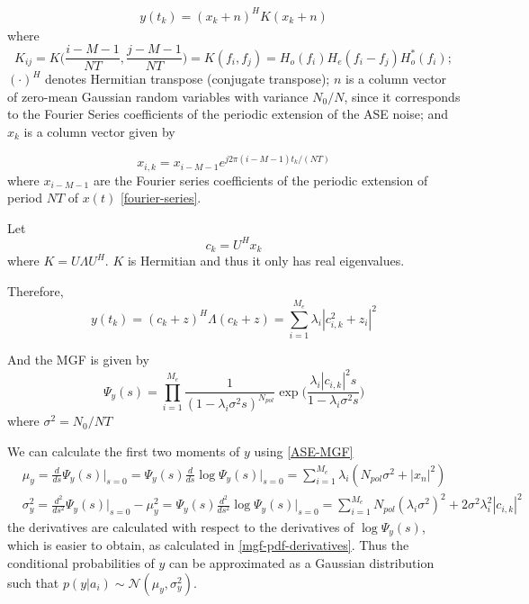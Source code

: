\documentclass[a4paper]{article}
\begin{document}
\begin{align} \nonumber
y(t_k) = (x_k + n)^HK(x_k + n)
\end{align}
where
\begin{equation}
K_{ij} = K\bigg(\frac{i-M-1}{NT}, \frac{j-M-1}{NT}\bigg)  = K(f_i, f_j) = H_o(f_i)H_e(f_i-f_j)H_o^*(f_i);
\end{equation}
$(\cdot)^H$ denotes Hermitian transpose (conjugate transpose); $n$ is a column vector of zero-mean Gaussian random variables with variance $N_0/N$, since it corresponds to the Fourier Series coefficients of the periodic extension of the ASE noise; and $x_k$ is a column vector given by

\begin{equation}
x_{i, k} = x_{i - M - 1}e^{j2\pi(i-M-1)t_k/(NT)}
\end{equation}
where $x_{i - M - 1}$ are the Fourier series coefficients of the periodic extension of period $NT$ of $x(t)$ \eqref{fourier-series}.

Let 
\begin{equation}
c_k = U^Hx_k
\end{equation}
where $K = U\Lambda U^H$. $K$ is Hermitian and thus it only has real eigenvalues.

Therefore,
\begin{equation}
y(t_k) = (c_k + z)^H\Lambda (c_k + z) = \sum_{i = 1}^{M_e} \lambda_i|c_{i, k}^2 + z_i|^2
\end{equation}

And the MGF is given by
\begin{equation} \label{ASE-MGF}
\Psi_y(s) = \prod_{i =1}^{M_e}\frac{1}{(1-\lambda_i\sigma^2s)^{N_{pol}}}\exp\bigg(\frac{\lambda_i|c_{i,k}|^2s}{1-\lambda_i\sigma^2s}\bigg)
\end{equation}
where $\sigma^2 = N_0/{NT}$

We can calculate the first two moments of $y$ using \eqref{ASE-MGF}
\begin{align}
& \mu_y = \frac{d}{ds}\Psi_y(s)\bigg|_{s=0} = \Psi_y(s)\frac{d}{ds}\log\Psi_y(s)\bigg|_{s=0} = \sum_{i=1}^{M_e} \lambda_i(N_{pol}\sigma^2 + |x_n|^2) \\
& \sigma_{y}^2 = \frac{d^2}{ds^2}\Psi_y(s)\bigg|_{s=0} -\mu_y^2 = \Psi_y(s)\frac{d^2}{ds^2}\log\Psi_y(s)\bigg|_{s=0} = \sum_{i =1}^{M_e} N_{pol}(\lambda_i\sigma^2)^2 + 2\sigma^2\lambda_i^2|c_{i,k}|^2
\end{align}
the derivatives are calculated with respect to the derivatives of $\log\Psi_y(s)$, which is easier to obtain, as calculated in \eqref{mgf-pdf-derivatives}. Thus the conditional probabilities of $y$ can be approximated as a Gaussian distribution such that $p(y|a_i) \sim \mathcal{N}(\mu_y, \sigma_y^2)$.
\end{document}
